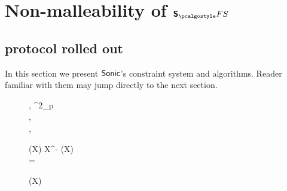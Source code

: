 
\section{Non-malleability of $\sonicprotfs$}
\label{sec:sonic}
\subsection{\sonic{} protocol rolled out}
In this section we present ${\textnormal{\textsf{Sonic}}}$'s constraint system and algorithms. Reader
familiar with them may jump directly to the next section.

 \begin{figure}[h!]
 \centering
 	\begin{pcvstack}
 		\begin{pchstack}
 			\procedure{$\kgen(\secparam, \maxdeg)$} {
 				\alpha, \chi \sample \FF^2_p \\ [\myskip]
 				\pcreturn {},\\
         \pcind {}, \gtar{\alpha}\\
 				\hphantom{\hspace*{5.5cm}}
 		}

 			\pchspace

 			 {
 				(X) \gets \alpha \cdot X^{\dconst - \maxconst} (X) \\ [\myskip]
 				\pcreturn {} = \\ [\myskip]
 				 }
 		\end{pchstack}

 		\begin{pchstack}
 			\procedure{$\open(\srs, z, s, f(X))$}
 			{
 				(X) \gets {}\\ [\myskip]
 				\pcreturn {}\\ [\myskip]
 				\hphantom{\hspace*{5.5cm}}
 			}


\end{pchstack}
\end{pcvstack}
\end{figure}
